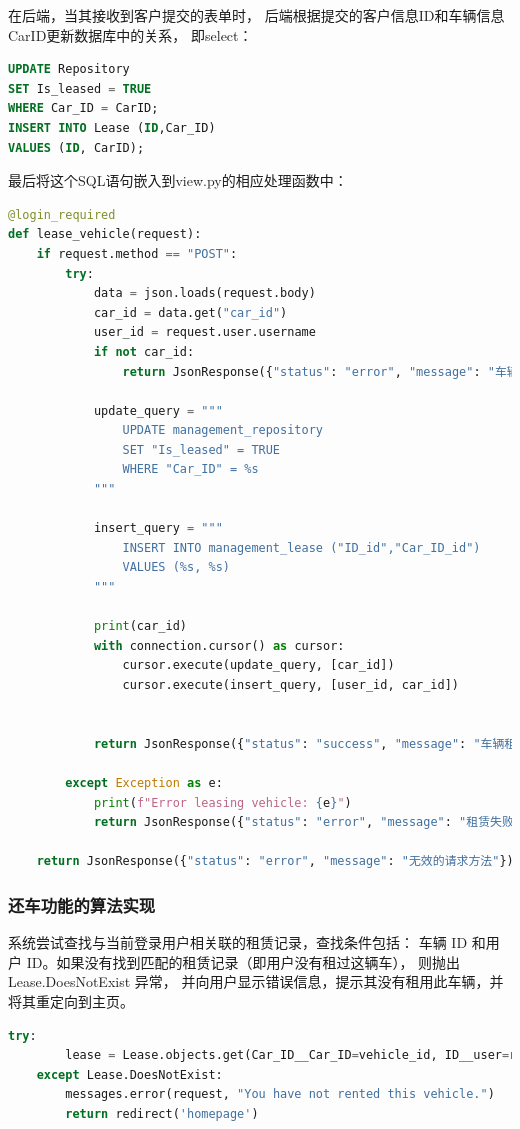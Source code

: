 \documentclass[UTF8,a4paper,12pt]{ctexart}
\begin{document}
在后端，当其接收到客户提交的表单时，
后端根据提交的客户信息ID和车辆信息CarID更新数据库中的关系，
即select：
\begin{lstlisting}[language=SQL]
UPDATE Repository
SET Is_leased = TRUE
WHERE Car_ID = CarID;
INSERT INTO Lease (ID,Car_ID)
VALUES (ID, CarID);
\end{lstlisting}
最后将这个SQL语句嵌入到view.py的相应处理函数中：
\begin{lstlisting}[language=Python]
@login_required
def lease_vehicle(request):
    if request.method == "POST":
        try:
            data = json.loads(request.body)
            car_id = data.get("car_id")  
            user_id = request.user.username  
            if not car_id:
                return JsonResponse({"status": "error", "message": "车辆ID不能为空"})

            update_query = """
                UPDATE management_repository
                SET "Is_leased" = TRUE
                WHERE "Car_ID" = %s
            """

            insert_query = """
                INSERT INTO management_lease ("ID_id","Car_ID_id")
                VALUES (%s, %s)
            """
            
            print(car_id)
            with connection.cursor() as cursor:
                cursor.execute(update_query, [car_id]) 
                cursor.execute(insert_query, [user_id, car_id])  
            

            return JsonResponse({"status": "success", "message": "车辆租赁成功！"})

        except Exception as e:
            print(f"Error leasing vehicle: {e}")
            return JsonResponse({"status": "error", "message": "租赁失败，请稍后再试。"})

    return JsonResponse({"status": "error", "message": "无效的请求方法"})    
\end{lstlisting}


\subsubsection{还车功能的算法实现}

系统尝试查找与当前登录用户相关联的租赁记录，查找条件包括：
车辆 ID 和用户 ID。如果没有找到匹配的租赁记录（即用户没有租过这辆车），
则抛出 Lease.DoesNotExist 异常，
并向用户显示错误信息，提示其没有租用此车辆，并将其重定向到主页。

\begin{lstlisting}[language=Python]
    try:
        lease = Lease.objects.get(Car_ID__Car_ID=vehicle_id, ID__user=request.user)
    except Lease.DoesNotExist:
        messages.error(request, "You have not rented this vehicle.")
        return redirect('homepage')
\end{lstlisting}
\end{document}

